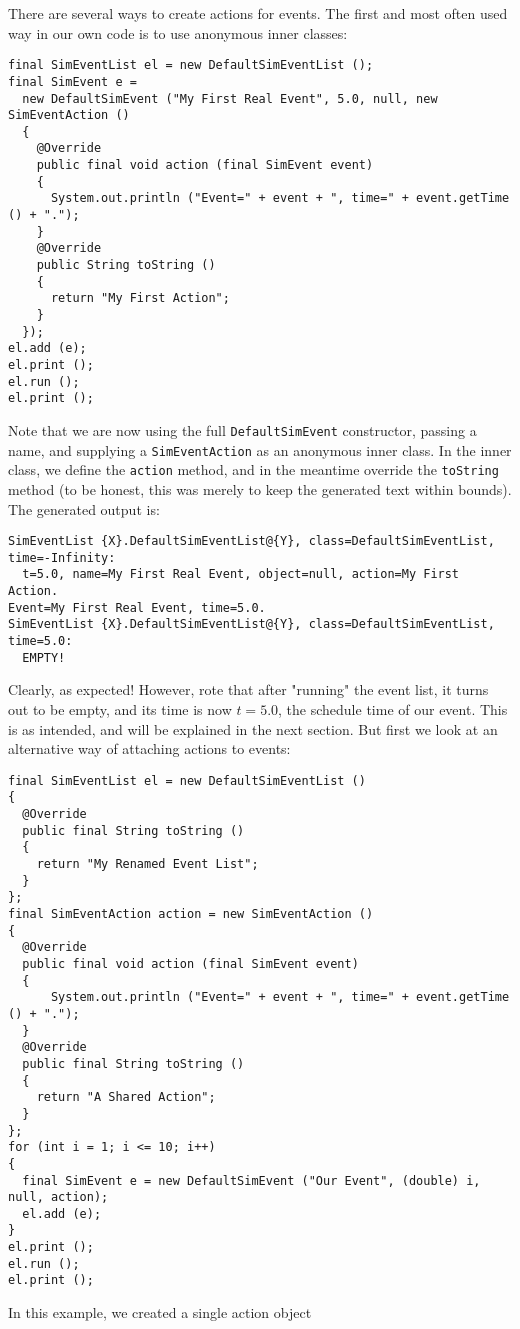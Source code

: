 \documentclass[12pt]{book}
\begin{document}
There are several ways to create actions for events.
The first and most often used way in our own code is to use anonymous inner classes:
\begin{lstlisting}[basicstyle=\tiny]
final SimEventList el = new DefaultSimEventList ();
final SimEvent e =
  new DefaultSimEvent ("My First Real Event", 5.0, null, new SimEventAction ()
  {
    @Override
    public final void action (final SimEvent event)
    {
      System.out.println ("Event=" + event + ", time=" + event.getTime () + ".");
    }
    @Override
    public String toString ()
    {
      return "My First Action";
    }
  });
el.add (e);
el.print ();
el.run ();
el.print ();
\end{lstlisting}
Note that we are now using the full \lstinline{DefaultSimEvent} constructor,
  passing a name, and supplying a \lstinline{SimEventAction}
  as an anonymous inner class.
In the inner class, we define the \lstinline{action} method,
  and in the meantime override the \lstinline{toString} method
  (to be honest, this was merely to keep the generated text within bounds).
The generated output is:
\begin{lstlisting}[basicstyle=\tiny]
SimEventList {X}.DefaultSimEventList@{Y}, class=DefaultSimEventList, time=-Infinity:
  t=5.0, name=My First Real Event, object=null, action=My First Action.
Event=My First Real Event, time=5.0.
SimEventList {X}.DefaultSimEventList@{Y}, class=DefaultSimEventList, time=5.0:
  EMPTY!
\end{lstlisting}
Clearly, as expected!
However, rote that after "running" the event list, it turns out to be empty,
  and its time is now $t=5.0$, the schedule time of our event.
This is as intended, and will be explained in the next section.
But first we look at an alternative way of attaching
  actions to events:
\begin{lstlisting}[basicstyle=\tiny]
final SimEventList el = new DefaultSimEventList ()
{
  @Override
  public final String toString ()
  {
    return "My Renamed Event List";
  } 
};
final SimEventAction action = new SimEventAction ()
{
  @Override
  public final void action (final SimEvent event)
  {
      System.out.println ("Event=" + event + ", time=" + event.getTime () + ".");
  }
  @Override
  public final String toString ()
  {
    return "A Shared Action";
  }
};
for (int i = 1; i <= 10; i++)
{
  final SimEvent e = new DefaultSimEvent ("Our Event", (double) i, null, action);
  el.add (e);
}
el.print ();
el.run ();
el.print ();
\end{lstlisting}
In this example, we created a single action object
\end{document}
